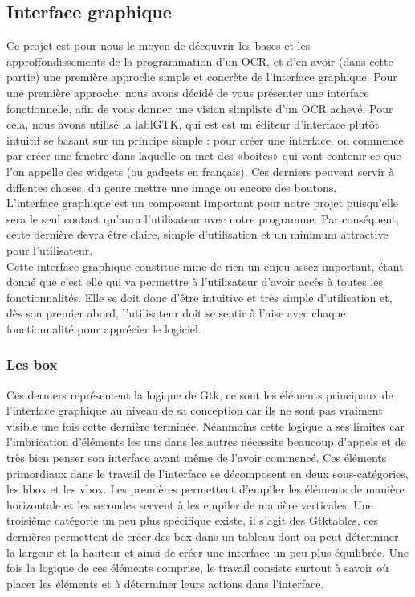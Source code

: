 \documentclass{article}
\begin{document}
\subsection{Interface graphique}
Ce projet est pour nous le moyen de découvrir les bases et les approffondissements de la programmation d’un OCR, et d’en avoir (dans cette partie) une première approche simple et concrète de l’interface graphique. Pour une première approche, nous avons décidé de vous présenter une interface fonctionnelle, afin de vous donner une vision simpliste d’un OCR achevé. Pour cela, nous avons utilisé la lablGTK, qui est est un éditeur d’interface plutôt intuitif se basant sur un principe simple : pour créer une interface, on commence par créer une fenetre dans laquelle on met des «boites» qui vont contenir ce que l’on appelle des widgets (ou gadgets en français). Ces derniers peuvent servir à diffentes choses, du genre mettre une image ou encore des boutons.\\
L’interface graphique est un composant important pour notre projet puisqu’elle sera le seul contact qu’aura l’utilisateur avec notre programme. Par conséquent, cette dernière  devra être claire, simple d’utilisation et un minimum attractive pour l’utilisateur.\\
Cette interface graphique constitue mine de rien un enjeu assez important, étant
donné que c’est elle qui va permettre à l’utilisateur d’avoir accès à toutes les fonctionnalités. Elle se doit donc d’être intuitive et très simple d’utilisation et, dès son premier abord, l’utilisateur doit se sentir à l’aise avec chaque fonctionnalité pour apprécier le logiciel.

\subsubsection{Les box}
Ces derniers représentent la logique de Gtk, ce sont les éléments principaux
de l’interface graphique au niveau de sa conception car ils ne sont pas vraiment
visible une fois cette dernière terminée. Néanmoins cette logique a ses limites
car l’imbrication d’éléments les uns dans les autres nécessite beaucoup d’appels
et de très bien penser son interface avant même de l’avoir commencé.
Ces éléments primordiaux dans le travail de l’interface se décomposent en
deux sous-catégories, les hbox et les vbox. Les premières permettent d’empiler
les éléments de manière horizontale et les secondes servent à les empiler
de manière verticales. Une troisième catégorie un peu plus spécifique existe, il
s’agit des Gtktables, ces dernières permettent de créer des box dans un tableau
dont on peut déterminer la largeur et la hauteur et ainsi de créer une interface
un peu plus équilibrée.
Une fois la logique de ces éléments comprise, le travail consiste surtout à
savoir où placer les éléments et à déterminer leurs actions dans l’interface.
\end{document}
